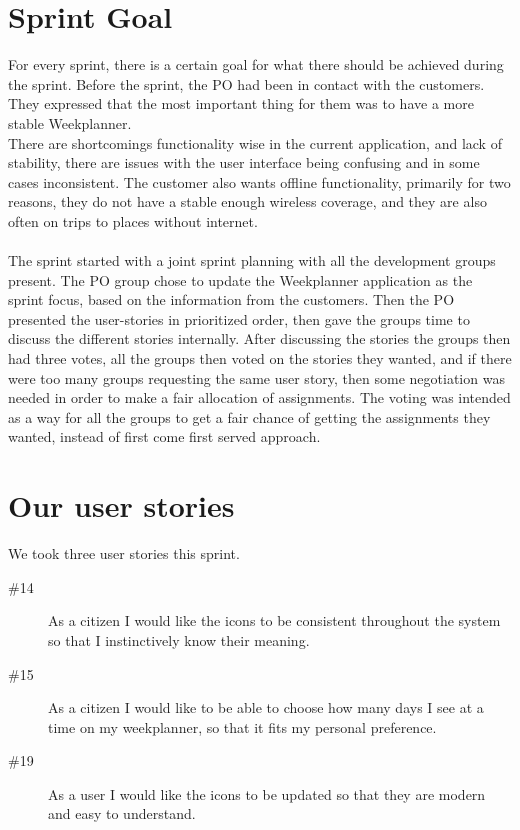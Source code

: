 \section{Sprint Goal}
For every sprint, there is a certain goal for what there should be achieved during the sprint. Before the sprint, the \gls{PO} had been in contact with the customers. They expressed that the most important thing for them was to have a more stable Weekplanner.\\
There are shortcomings functionality wise in the current application, and lack of stability, there are issues with the user interface being confusing and in some cases inconsistent. The customer also wants offline functionality, primarily for two reasons, they do not have a stable enough wireless coverage, and they are also often on trips to places without internet.\\
\\
The sprint started with a joint sprint planning with all the development groups present. The \gls{PO} group chose to update the Weekplanner application as the sprint focus, based on the information from the customers. Then the \gls{PO} presented the user-stories in prioritized order, then gave the groups time to discuss the different stories internally. After discussing the stories the groups then had three votes, all the groups then voted on the stories they wanted, and if there were too many groups requesting the same user story, then some negotiation was needed in order to make a fair allocation of assignments. The voting was intended as a way for all the groups to get a fair chance of getting the assignments they wanted, instead of first come first served approach.\\

\section{Our user stories}
We took three user stories this sprint.
\begin{description}
    \item [\#14] As a citizen I would like the icons to be consistent throughout the system so that I instinctively know their meaning.
    \item [\#15] As a citizen I would like to be able to choose how many days I see at a time on my weekplanner, so that it fits my personal preference.
    \item [\#19] As a user I would like the icons to be updated so that they are modern and easy to understand.
\end{description}

